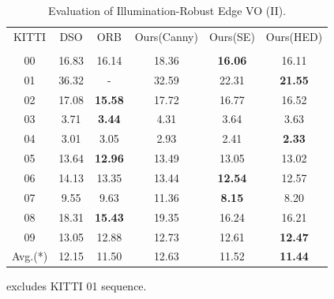 \begin{table}[t]
	\centering
	\caption[Evaluation of Illumination-Robust Edge VO (II)]{Evaluation of Illumination-Robust Edge VO (II).
	\label{tbl:edge_evalKITTI}}
	\begin{tabular}{|c|ccccc|}
\hline
KITTI & DSO                                  & ORB                           & Ours(Canny)                                    &  Ours(SE)                                 & Ours(HED)           \\ 
\cite{geiger2012we}	     & \cite{engel2017direct}     & \cite{mur2017orb}    &  \cite{canny1987computational}    & \cite{dollar2013structured}   & \cite{xie2015holistically}           \\   \hline
00        & 16.83    & 16.14                 & 18.36  & \textbf{16.06} & 16.11 \\
01        & 36.32    & -                        & 32.59  & 22.31               & \textbf{21.55} \\
02        & 17.08    & \textbf{15.58}   & 17.72   & 16.77               & 16.52          \\
03        & 3.71      & \textbf{3.44}     & 4.31    & 3.64                 & 3.63           \\
04        & 3.01      & 3.05                   & 2.93    & 2.41                  & \textbf{2.33} \\
05        & 13.64   & \textbf{12.96}    & 13.49  & 13.05               & 13.02           \\
06        & 14.13    & 13.35                  & 13.44  & \textbf{12.54} & 12.57           \\
07        & 9.55     & 9.63                  & 11.36    & \textbf{8.15}   & 8.20           \\
08        & 18.31   & \textbf{15.43}    & 19.35   & 16.24               & 16.21          \\
09        & 13.05   & 12.88                  & 12.73   & 12.61                & \textbf{12.47} \\ \hline
Avg.(*) &12.15    & 11.50                   & 12.63  & 11.52                &  \textbf{11.44} \\ \hline
	\end{tabular}         
	{\footnotesize * excludes KITTI 01 sequence. }
\end{table}


